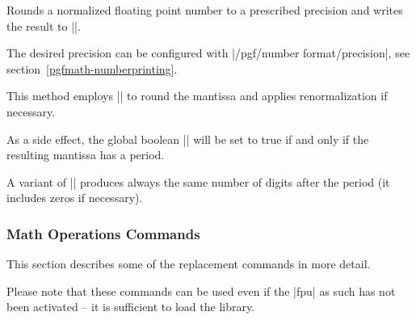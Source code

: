 \begin{command}{}
    Rounds a normalized floating point number to a prescribed precision and
    writes the result to |\pgfmathresult|.

    The desired precision can be configured with
    |/pgf/number format/precision|, see section~\ref{pgfmath-numberprinting}.

    This method employs |\pgfmathroundto| to round the mantissa and applies
    renormalization if necessary.

    As a side effect, the global boolean |\ifpgfmathfloatroundhasperiod| will
    be set to true if and only if the resulting mantissa has a period.
\begin{codeexample}[]
\pgfmathfloatround{\pgfmathresult}
\pgfmathfloattosci{\pgfmathresult}
\pgfmathresult
\end{codeexample}
\begin{codeexample}[]
\pgfmathfloatround{\pgfmathresult}
\pgfmathfloattosci{\pgfmathresult}
\pgfmathresult
\end{codeexample}
\end{command}

\begin{command}{}
    A variant of |\pgfmathfloatround| produces always the same number of digits
    after the period (it includes zeros if necessary).
\begin{codeexample}[]
\pgfmathfloatroundzerofill{\pgfmathresult}
\pgfmathfloattosci{\pgfmathresult}
\pgfmathresult
\end{codeexample}
\begin{codeexample}[]
\pgfmathfloatroundzerofill{\pgfmathresult}
\pgfmathfloattosci{\pgfmathresult}
\pgfmathresult
\end{codeexample}
\end{command}


\subsubsection{Math Operations Commands}

This section describes some of the replacement commands in more detail.

Please note that these commands can be used even if the |fpu| as such has not
been activated -- it is sufficient to load the library.

